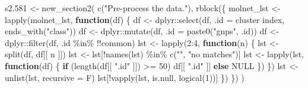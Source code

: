\documentclass[
]{article}
\newenvironment{Shaded}{\begin{snugshade}}{\end{snugshade}}
\newcommand{\AttributeTok}[1]{\textcolor[rgb]{0.77,0.63,0.00}{#1}}
\newcommand{\ConstantTok}[1]{\textcolor[rgb]{0.00,0.00,0.00}{#1}}
\newcommand{\ControlFlowTok}[1]{\textcolor[rgb]{0.13,0.29,0.53}{\textbf{#1}}}
\newcommand{\DecValTok}[1]{\textcolor[rgb]{0.00,0.00,0.81}{#1}}
\newcommand{\FloatTok}[1]{\textcolor[rgb]{0.00,0.00,0.81}{#1}}
\newcommand{\FunctionTok}[1]{\textcolor[rgb]{0.00,0.00,0.00}{#1}}
\newcommand{\NormalTok}[1]{#1}
\newcommand{\OtherTok}[1]{\textcolor[rgb]{0.56,0.35,0.01}{#1}}
\newcommand{\SpecialCharTok}[1]{\textcolor[rgb]{0.00,0.00,0.00}{#1}}
\newcommand{\StringTok}[1]{\textcolor[rgb]{0.31,0.60,0.02}{#1}}
\begin{document}
\begin{Shaded}
\begin{Highlighting}[]
\NormalTok{s2}\FloatTok{.581} \OtherTok{\textless{}{-}} \FunctionTok{new\_section2}\NormalTok{(}
  \FunctionTok{c}\NormalTok{(}\StringTok{"Pre{-}process the data."}\NormalTok{),}
  \FunctionTok{rblock}\NormalTok{(\{}
\NormalTok{    molnet\_lst }\OtherTok{\textless{}{-}} \FunctionTok{lapply}\NormalTok{(molnet\_lst,}
      \ControlFlowTok{function}\NormalTok{(df) \{}
\NormalTok{        df }\OtherTok{\textless{}{-}}\NormalTok{ dplyr}\SpecialCharTok{::}\FunctionTok{select}\NormalTok{(df, }\AttributeTok{.id =} \StringTok{\textasciigrave{}}\AttributeTok{cluster index}\StringTok{\textasciigrave{}}\NormalTok{, }\FunctionTok{ends\_with}\NormalTok{(}\StringTok{"class"}\NormalTok{))}
\NormalTok{        df }\OtherTok{\textless{}{-}}\NormalTok{ dplyr}\SpecialCharTok{::}\FunctionTok{mutate}\NormalTok{(df, }\AttributeTok{.id =} \FunctionTok{paste0}\NormalTok{(}\StringTok{"gnps"}\NormalTok{, .id))}
\NormalTok{        df }\OtherTok{\textless{}{-}}\NormalTok{ dplyr}\SpecialCharTok{::}\FunctionTok{filter}\NormalTok{(df, .id }\SpecialCharTok{\%in\%} \SpecialCharTok{!!}\NormalTok{common)}
\NormalTok{        lst }\OtherTok{\textless{}{-}} \FunctionTok{lapply}\NormalTok{(}\DecValTok{2}\SpecialCharTok{:}\DecValTok{4}\NormalTok{,}
          \ControlFlowTok{function}\NormalTok{(n) \{}
\NormalTok{            lst }\OtherTok{\textless{}{-}} \FunctionTok{split}\NormalTok{(df, df[[ n ]])}
\NormalTok{            lst }\OtherTok{\textless{}{-}}\NormalTok{ lst[}\SpecialCharTok{!}\FunctionTok{names}\NormalTok{(lst) }\SpecialCharTok{\%in\%} \FunctionTok{c}\NormalTok{(}\StringTok{""}\NormalTok{, }\StringTok{"no matches"}\NormalTok{)]}
\NormalTok{            lst }\OtherTok{\textless{}{-}} \FunctionTok{lapply}\NormalTok{(lst,}
              \ControlFlowTok{function}\NormalTok{(df) \{}
                \ControlFlowTok{if}\NormalTok{ (}\FunctionTok{length}\NormalTok{(df[[ }\StringTok{".id"}\NormalTok{ ]]) }\SpecialCharTok{\textgreater{}=} \DecValTok{50}\NormalTok{) df[[ }\StringTok{".id"}\NormalTok{ ]]}
                \ControlFlowTok{else} \ConstantTok{NULL}
\NormalTok{              \})}
\NormalTok{          \})}
\NormalTok{        lst }\OtherTok{\textless{}{-}} \FunctionTok{unlist}\NormalTok{(lst, }\AttributeTok{recursive =}\NormalTok{ F)}
\NormalTok{        lst[}\SpecialCharTok{!}\FunctionTok{vapply}\NormalTok{(lst, is.null, }\FunctionTok{logical}\NormalTok{(}\DecValTok{1}\NormalTok{))]}
\NormalTok{      \})}
\NormalTok{  \})}
\NormalTok{)}


\end{Highlighting}
\end{Shaded}
\end{document}

